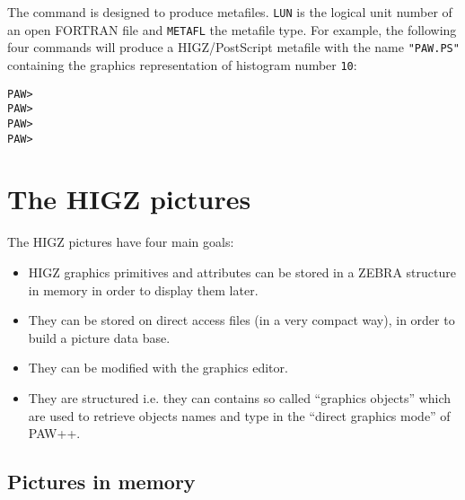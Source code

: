 The command  is designed
to produce metafiles. 
\texttt{LUN} is the logical unit number of an open
FORTRAN file and \texttt{METAFL} the metafile type.
For example, the following four commands
will produce a HIGZ/PostScript metafile with the name \texttt{"PAW.PS"}
containing the graphics representation of histogram number \texttt{10}:

\begin{alltt}
PAW > 
PAW > 
PAW > 
PAW > 
\end{alltt}

\section{The HIGZ pictures}
\label{sec:H2HIGZP}

The HIGZ pictures have four main goals:

\begin{itemize}
\item HIGZ graphics primitives and attributes can be stored
      in a ZEBRA structure in memory in order to display them later.
\item They can be stored on direct access files (in a very compact way), 
      in order to build a picture data base.
\item They can be modified with the graphics editor.
\item They are structured i.e. they can contains so called ``graphics objects''
      which are used to retrieve objects names and type in the ``direct
      graphics mode'' of PAW++.
\end{itemize}

\subsection{Pictures in memory}
\label{sec:H3PICT}

